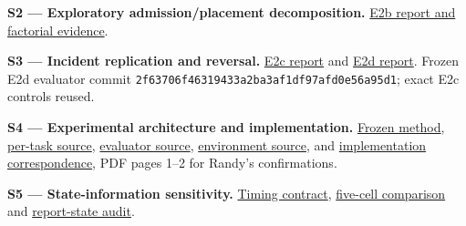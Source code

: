\documentclass[11pt,a4paper]{article}
\begin{document}
\label{source-s2}

\textbf{S2 --- Exploratory admission/placement decomposition.} \href{\detokenize{../../evaluation/vec_followup_2026-09-07/historical_e0_e2d/experiments/E2b/README.md}}{E2b report and factorial evidence}.

\label{source-s3}

\textbf{S3 --- Incident replication and reversal.} \href{\detokenize{../../evaluation/vec_followup_2026-09-07/historical_e0_e2d/experiments/E2c/README.md}}{E2c report} and \href{\detokenize{../../evaluation/vec_followup_2026-09-07/historical_e0_e2d/experiments/E2d/README.md}}{E2d report}. Frozen E2d evaluator commit \texttt{2f63706f46319433a2ba3af1df97afd0e56a95d1}; exact E2c controls reused.

\label{source-s4}

\textbf{S4 --- Experimental architecture and implementation.} \href{\detokenize{../../evaluation/vec_followup_2026-09-07/historical_e0_e2d/docs/METHODOLOGY.md}}{Frozen method}, \href{\detokenize{../../evaluation/vec_followup_2026-09-07/frozen_evaluator/eval/e2d_per_task_placement.py}}{per-task source}, \href{\detokenize{../../evaluation/vec_followup_2026-09-07/frozen_evaluator/eval/eval_sumo_stage1_mc.py}}{evaluator source}, \href{\detokenize{../empirical_extension_2026-09-08/experimental/vendor/vec_jax.py}}{environment source}, and \href{\detokenize{../../correspondence/sandra_randy_vec_progress_email_thread_2026-08-18.md}}{implementation correspondence}, PDF pages 1--2 for Randy's confirmations.

\label{source-s5}

\textbf{S5 --- State-information sensitivity.} \href{\detokenize{../../evaluation/vec_followup_2026-09-07/frozen_evaluator/docs/RSU_STATE_DELAY.md}}{Timing contract}, \href{\detokenize{../../evaluation/vec_followup_2026-09-07/state-delay-pilot-2026-09-07/comparison.csv}}{five-cell comparison} and \href{\detokenize{../../evaluation/vec_followup_2026-09-07/state-delay-pilot-2026-09-07/mechanism_audit.json}}{report-state audit}.
\end{document}
